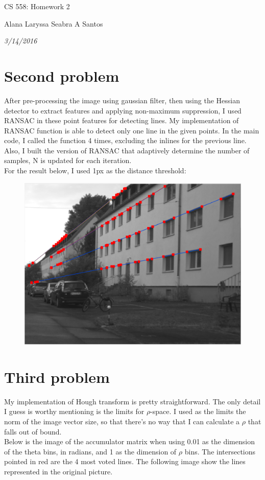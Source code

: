 \documentclass{article}
\begin{document}
\centerline{\sc \large CS 558: Homework 2}
\vspace{.5pc}
\centerline{Alana Laryssa Seabra A Santos}
\centerline{\it 3/14/2016}
\vspace{1pc}

\section{Second problem}

After pre-processing the image using gaussian filter, then using the Hessian detector to extract features and applying non-maximum suppression, I used RANSAC in these point features for detecting lines. My implementation of RANSAC function is able to detect only one line in the given points. In the main code, I called the function 4 times, excluding the inlines for the previous line. Also, I built the version of RANSAC that adaptively determine the number of samples, N is updated for each iteration. \\
For the result below, I used 1px as the distance threshold:

\begin{figure}[ht]
\centering
  \includegraphics[scale=0.45]{ransac.png}
\end{figure}

\section{Third problem}

My implementation of Hough transform is pretty straightforward. The only detail I guess is worthy mentioning is the limits for $\rho$-space. I used as the limits the norm of the image vector size, so that there's no way that I can calculate a $\rho$ that falls out of bound. \\
Below is the image of the accumulator matrix when using 0.01 as the dimension of the theta bins, in radians, and 1 as the dimension of $\rho$ bins. The intersections pointed in red are the 4 most voted lines. The following image show the lines represented in the original picture.
\end{document}
